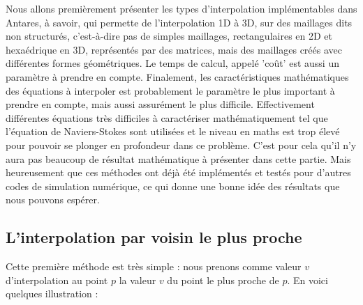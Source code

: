 \vspace{0,5cm}

Nous allons premièrement présenter les types d'interpolation implémentables dans Antares, à savoir, qui permette de l'interpolation \ac{1D} à 3D, sur des maillages dits non structurés, c'est-à-dire pas de simples maillages, rectangulaires en 2D et hexaédrique en 3D, représentés par des matrices, mais des maillages créés avec différentes formes géométriques.
Le temps de calcul, appelé 'coût' est aussi un paramètre à prendre en compte.
Finalement, les caractéristiques mathématiques des équations à interpoler est probablement le paramètre le plus important à prendre en compte, mais aussi assurément le plus difficile. Effectivement différentes équations très difficiles à caractériser mathématiquement tel que l'équation de Naviers-Stokes sont utilisées et le niveau en maths est trop élevé pour pouvoir se plonger en profondeur dans ce problème. C'est pour cela qu'il n'y aura pas beaucoup de résultat mathématique à présenter dans cette partie. Mais heureusement que ces méthodes ont déjà été implémentés et testés pour d'autres codes de simulation numérique, ce qui donne une bonne idée des résultats que nous pouvons espérer.

\newpage

\subsection{L'interpolation par voisin le plus proche}
Cette première méthode est très simple : nous prenons comme valeur \( v \) d'interpolation au point \( p \) la valeur \( v \) du point le plus proche de \( p \).
En voici quelques illustration :


\begin{center}
\end{center}

